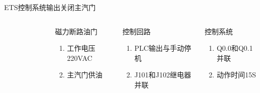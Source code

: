 \documentclass[12pt,hyperref={CJKbookmarks=true}]{beamer} %
\begin{document}
\begin{frame}{ETS控制系统输出}{关闭主汽门}
\begin{columns}
\begin{figure}
\end{figure}
\begin{block}{磁力断路油门}
			\begin{enumerate}
				\item  工作电压220VAC
				\item  主汽门供油
				\end{enumerate}
\end{block}
\begin{exampleblock}{控制回路}
			\begin{enumerate}
				\item PLC输出与手动停机
				\item J101和J102继电器并联
				\end{enumerate}
\end{exampleblock}
\begin{alertblock}{控制系统}
				\begin{enumerate}
				\item Q0.0和Q0.1并联
				\item 动作时间15S
				\end{enumerate}
\end{alertblock}
		\end{columns}
	\end{frame}
\end{document}
